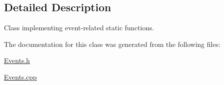 \subsection{Detailed Description}
Class implementing event-\/related static functions. 

The documentation for this class was generated from the following files\+:\begin{DoxyCompactItemize}
\item 
\hyperlink{Events_8h}{Events.\+h}\item 
\hyperlink{Events_8cpp}{Events.\+cpp}\end{DoxyCompactItemize}

